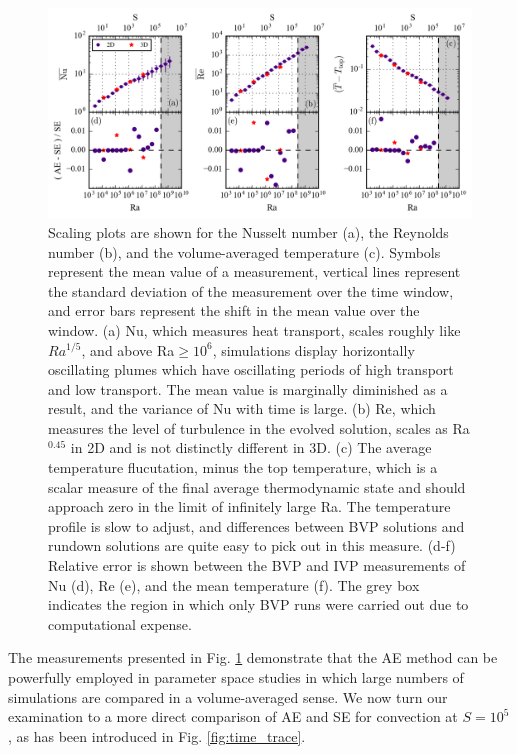 \documentclass[aps, pre, onecolumn, nofootinbib, notitlepage, groupedaddress, amsfonts, amssymb, amsmath, longbibliography]{revtex4-1}
\begin{document}
\begin{figure}[t]
\includegraphics[width=\textwidth]{./figs/parameter_space_comparison.png}
\caption{Scaling plots are shown for the Nusselt number (a), the
Reynolds number (b), and the volume-averaged temperature (c).  
Symbols represent the mean value of
a measurement, vertical lines represent the standard deviation of the measurement over the
time window, and error bars represent the shift in the mean value over the window.
(a) Nu, which measures heat transport, scales roughly like $Ra^{1/5}$, and above Ra$\geq 10^6$,
simulations display horizontally oscillating plumes which have oscillating periods of high transport
and low transport.  The mean value is marginally diminished as a result, and the variance of Nu with time
is large. (b) Re, which measures the level of turbulence in the evolved solution, scales as
Ra$^{0.45}$ in 2D and is not distinctly different in 3D. (c) The average temperature flucutation, minus the top
temperature, which is a scalar measure of the final average thermodynamic state and should approach zero
in the limit of infinitely large Ra.
The temperature profile is slow to adjust, and differences between
BVP solutions and rundown solutions are quite easy to pick out in this measure. (d-f)
Relative error is shown between the BVP and IVP measurements of Nu (d), Re (e), and the
mean temperature (f). The grey box indicates the region in which only BVP runs were
carried out due to computational expense.
\label{fig:parameter_space_comparison} }
\end{figure}

The measurements presented in Fig. \ref{fig:parameter_space_comparison} demonstrate
that the AE method can be powerfully employed in parameter space studies in which
large numbers of simulations are compared in a volume-averaged sense.  We now turn
our examination to a more direct comparison of AE and SE for convection at
$S = 10^5$, as has been introduced in Fig. \ref{fig:time_trace}.
\end{document}
